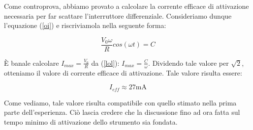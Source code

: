  
Come controprova, abbiamo provato a calcolare la corrente efficace di attivazione necessaria per far scattare l'interruttore differenziale. Consideriamo dunque l'equazione (\ref{oi}) e riscriviamola nella seguente forma:

\begin{equation}
\frac{V_0 \omega}{R}cos(\omega t)=C
\label{lol}
\end{equation}

\`E banale calcolare $I_{max}=\frac{V_0}{R}$ da (\ref{lol}): $I_{max}=\frac{C}{\omega}$. Dividendo tale valore per $\sqrt{2}$, otteniamo il valore di corrente efficace di attivazione. Tale valore risulta essere:

\begin{equation}
I_{eff} \approx 27 \si{\milli\ampere}
\end{equation}

Come vediamo, tale valore risulta compatibile con quello stimato nella prima parte dell'esperienza. Ciò lascia credere che la discussione fino ad ora fatta sul tempo minimo di attivazione dello strumento sia fondata. 